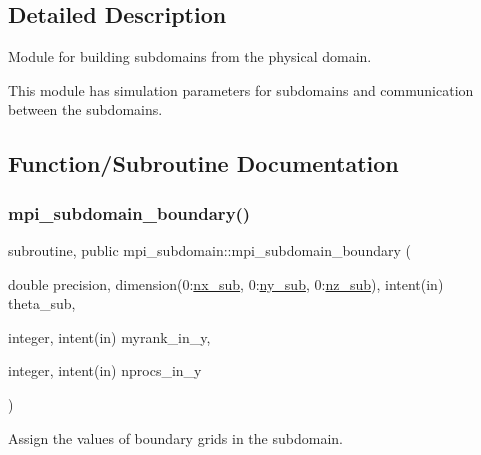 \subsection{Detailed Description}
Module for building subdomains from the physical domain. 

This module has simulation parameters for subdomains and communication between the subdomains. 

\subsection{Function/\+Subroutine Documentation}
\mbox{\label{namespacempi__subdomain_a55659431068678c08d21847338390ea8}} 
\subsubsection{\texorpdfstring{mpi\+\_\+subdomain\+\_\+boundary()}{mpi\_subdomain\_boundary()}}
{\footnotesize\ttfamily subroutine, public mpi\+\_\+subdomain\+::mpi\+\_\+subdomain\+\_\+boundary (\begin{DoxyParamCaption}\item[{double precision, dimension(0\+:\hyperlink{namespacempi__subdomain_a005fe127fe0fc85b932814a820a36444}{nx\+\_\+sub}, 0\+:\hyperlink{namespacempi__subdomain_a665ba05d0ae9309dd28b9b513a0c87a1}{ny\+\_\+sub}, 0\+:\hyperlink{namespacempi__subdomain_a07555cc931ac78376a4c81207662251f}{nz\+\_\+sub}), intent(in)}]{theta\+\_\+sub,  }\item[{integer, intent(in)}]{myrank\+\_\+in\+\_\+y,  }\item[{integer, intent(in)}]{nprocs\+\_\+in\+\_\+y }\end{DoxyParamCaption})}



Assign the values of boundary grids in the subdomain. 


